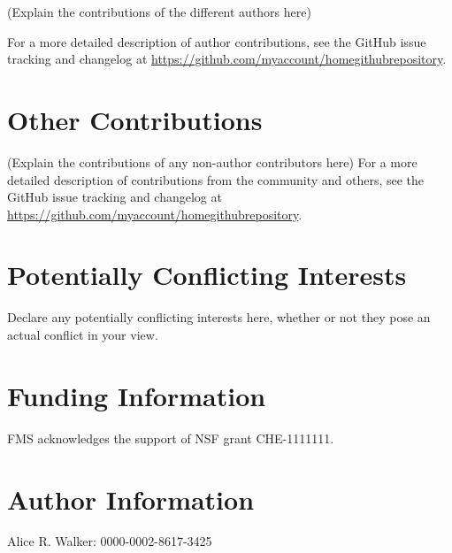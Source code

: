 \documentclass[9pt,review]{livecoms}
\newcommand{\githubrepository}{\url{https://github.com/myaccount/homegithubrepository}}  %
\begin{document}
(Explain the contributions of the different authors here)

For a more detailed description of author contributions,
see the GitHub issue tracking and changelog at \githubrepository.

\section*{Other Contributions}
%

(Explain the contributions of any non-author contributors here)
For a more detailed description of contributions from the community and others, see the GitHub issue tracking and changelog at \githubrepository.

\section*{Potentially Conflicting Interests}

Declare any potentially conflicting interests here, whether or not they pose an actual conflict in your view.

\section*{Funding Information}
FMS acknowledges the support of NSF grant CHE-1111111.

\section*{Author Information}
\makeorcid
Alice R. Walker: 0000-0002-8617-3425



\end{document}

